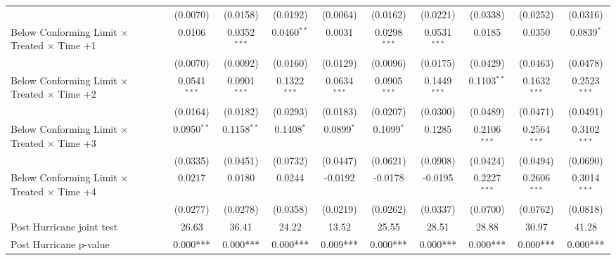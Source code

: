 \begin{tabular}{lccccccccc}
                                                              & (0.0070)       & (0.0158)       & (0.0192)       & (0.0064)       & (0.0162)       & (0.0221)       & (0.0338)       & (0.0252)       & (0.0316)\\   
   Below Conforming Limit $\times$ Treated $\times$ Time +1   & 0.0106         & 0.0352$^{***}$ & 0.0460$^{**}$  & 0.0031         & 0.0298$^{***}$ & 0.0531$^{***}$ & 0.0185         & 0.0350         & 0.0839$^{*}$\\   
                                                              & (0.0070)       & (0.0092)       & (0.0160)       & (0.0129)       & (0.0096)       & (0.0175)       & (0.0429)       & (0.0463)       & (0.0478)\\   
   Below Conforming Limit $\times$ Treated $\times$ Time +2   & 0.0541$^{***}$ & 0.0901$^{***}$ & 0.1322$^{***}$ & 0.0634$^{***}$ & 0.0905$^{***}$ & 0.1449$^{***}$ & 0.1103$^{**}$  & 0.1632$^{***}$ & 0.2523$^{***}$\\   
                                                              & (0.0164)       & (0.0182)       & (0.0293)       & (0.0183)       & (0.0207)       & (0.0300)       & (0.0489)       & (0.0471)       & (0.0491)\\   
   Below Conforming Limit $\times$ Treated $\times$ Time +3   & 0.0950$^{**}$  & 0.1158$^{**}$  & 0.1408$^{*}$   & 0.0899$^{*}$   & 0.1099$^{*}$   & 0.1285         & 0.2106$^{***}$ & 0.2564$^{***}$ & 0.3102$^{***}$\\   
                                                              & (0.0335)       & (0.0451)       & (0.0732)       & (0.0447)       & (0.0621)       & (0.0908)       & (0.0424)       & (0.0494)       & (0.0690)\\   
   Below Conforming Limit $\times$ Treated $\times$ Time +4   & 0.0217         & 0.0180         & 0.0244         & -0.0192        & -0.0178        & -0.0195        & 0.2227$^{***}$ & 0.2606$^{***}$ & 0.3014$^{***}$\\   
                                                              & (0.0277)       & (0.0278)       & (0.0358)       & (0.0219)       & (0.0262)       & (0.0337)       & (0.0700)       & (0.0762)       & (0.0818)\\   
   Post Hurricane joint test                                  & 26.63          & 36.41          & 24.22          & 13.52          & 25.55          & 28.51          & 28.88          & 30.97          & 41.28\\  
   Post Hurricane p-value                                     & 0.000***       & 0.000***       & 0.000***       & 0.009***       & 0.000***       & 0.000***       & 0.000***       & 0.000***       & 0.000***\\  

\end{tabular}
